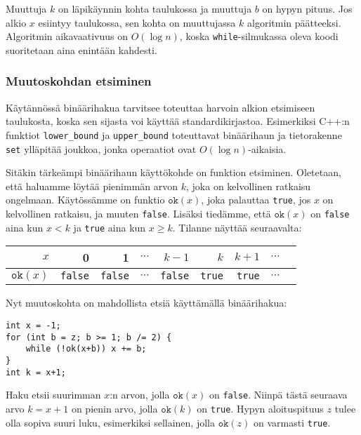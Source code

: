 Muuttuja $k$ on läpikäynnin kohta taulukossa
ja muuttuja $b$ on hypyn pituus.
Jos alkio $x$ esiintyy taulukossa,
sen kohta on muuttujassa $k$ algoritmin päätteeksi.
Algoritmin aikavaativuus on $O(\log n)$,
koska \texttt{while}-silmukassa oleva koodi suoritetaan
aina enintään kahdesti.

\subsubsection{Muutoskohdan etsiminen}

Käytännössä binäärihakua tarvitsee toteuttaa
harvoin alkion etsimiseen taulukosta,
koska sen sijasta voi käyttää standardikirjastoa.
Esimerkiksi C++:n funktiot \texttt{lower\_bound}
ja \texttt{upper\_bound} toteuttavat binäärihaun
ja tietorakenne \texttt{set} ylläpitää joukkoa,
jonka operaatiot ovat $O(\log n)$-aikaisia.

Sitäkin tärkeämpi binäärihaun käyttökohde on 
funktion  etsiminen.
Oletetaan, että haluamme löytää pienimmän arvon $k$,
joka on kelvollinen ratkaisu ongelmaan.
Käytössämme on funktio $\texttt{ok}(x)$,
joka palauttaa \texttt{true}, jos $x$ on kelvollinen
ratkaisu, ja muuten \texttt{false}.
Lisäksi tiedämme, että $\texttt{ok}(x)$ on \texttt{false}
aina kun $x<k$ ja \texttt{true} aina kun $x \geq k$.
Tilanne näyttää seuraavalta:

\begin{center}
\begin{tabular}{r|rrrrrrrr}
$x$ & 0 & 1 & $\cdots$ & $k-1$ & $k$ & $k+1$ & $\cdots$ \\
\hline
$\texttt{ok}(x)$ & \texttt{false} & \texttt{false}
& $\cdots$ & \texttt{false} & \texttt{true} & \texttt{true} & $\cdots$ \\
\end{tabular}
\end{center}

\noindent
Nyt muutoskohta on mahdollista etsiä käyttämällä
binäärihakua:

\begin{lstlisting}
int x = -1;
for (int b = z; b >= 1; b /= 2) {
    while (!ok(x+b)) x += b;
}
int k = x+1;
\end{lstlisting}

Haku etsii suurimman $x$:n arvon,
jolla $\texttt{ok}(x)$ on \texttt{false}.
Niinpä tästä seuraava arvo $k=x+1$
on pienin arvo, jolla $\texttt{ok}(k)$ on \texttt{true}.
Hypyn aloituspituus $z$ tulee olla 
sopiva suuri luku, esimerkiksi sellainen,
jolla $\texttt{ok}(z)$ on varmasti \texttt{true}.

